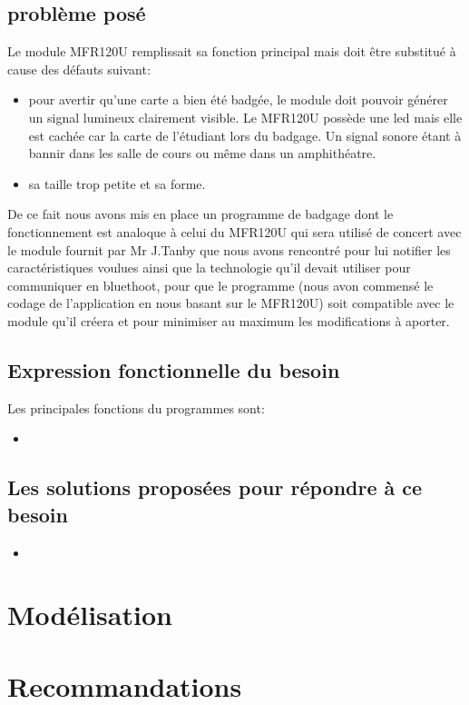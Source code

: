 \subsection{problème posé}
Le module MFR120U remplissait sa fonction principal mais doit être substitué à cause des défauts suivant:
\begin{itemize}
\item pour avertir qu'une carte a bien été badgée, le module doit pouvoir générer un signal lumineux clairement visible. Le MFR120U possède une led mais elle est cachée car la carte de l'étudiant lors du badgage. Un signal sonore étant à bannir dans les salle de cours ou même dans un amphithéatre.
\item sa taille trop petite et sa forme.
\end{itemize}
De ce fait nous avons mis en place un programme de badgage dont le fonctionnement est analoque à celui du MFR120U qui sera utilisé de concert avec le module fournit par Mr J.Tanby que nous avons rencontré pour lui notifier les caractéristiques voulues ainsi que la technologie qu'il devait utiliser pour communiquer en bluethoot, pour que le programme (nous avon commensé le codage de l'application en nous basant sur le MFR120U) soit compatible avec le module qu'il créera et pour minimiser au maximum les modifications à aporter. \newline
\subsection{Expression fonctionnelle du besoin}
Les principales fonctions du programmes sont:
\begin{itemize}
\item 
\end{itemize}
\subsection{Les solutions proposées pour répondre à ce besoin}
\begin{itemize}
\item 
\end{itemize}
\section{Modélisation}
\section{Recommandations}
